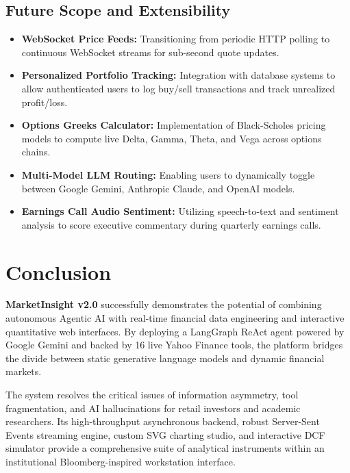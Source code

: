 \documentclass[12pt,a4paper]{report}
\begin{document}
\section{Future Scope and Extensibility}

\begin{itemize}[leftmargin=*,label=$\bullet$]
  \item \textbf{WebSocket Price Feeds:} Transitioning from periodic HTTP polling to continuous WebSocket streams for sub-second quote updates.
  \item \textbf{Personalized Portfolio Tracking:} Integration with database systems to allow authenticated users to log buy/sell transactions and track unrealized profit/loss.
  \item \textbf{Options Greeks Calculator:} Implementation of Black-Scholes pricing models to compute live Delta, Gamma, Theta, and Vega across options chains.
  \item \textbf{Multi-Model LLM Routing:} Enabling users to dynamically toggle between Google Gemini, Anthropic Claude, and OpenAI models.
  \item \textbf{Earnings Call Audio Sentiment:} Utilizing speech-to-text and sentiment analysis to score executive commentary during quarterly earnings calls.
\end{itemize}

\clearpage
\chapter{Conclusion}

\begin{mdframed}[linecolor=cbitred,linewidth=1.5pt,
  innerleftmargin=14pt,innerrightmargin=14pt,
  innertopmargin=14pt,innerbottommargin=14pt]
\textbf{MarketInsight v2.0} successfully demonstrates the potential of combining autonomous Agentic AI with real-time financial data engineering and interactive quantitative web interfaces. By deploying a LangGraph ReAct agent powered by Google Gemini and backed by 16 live Yahoo Finance tools, the platform bridges the divide between static generative language models and dynamic financial markets.
\end{mdframed}

\vspace{0.8cm}

The system resolves the critical issues of information asymmetry, tool fragmentation, and AI hallucinations for retail investors and academic researchers. Its high-throughput asynchronous backend, robust Server-Sent Events streaming engine, custom SVG charting studio, and interactive DCF simulator provide a comprehensive suite of analytical instruments within an institutional Bloomberg-inspired workstation interface.
\end{document}
